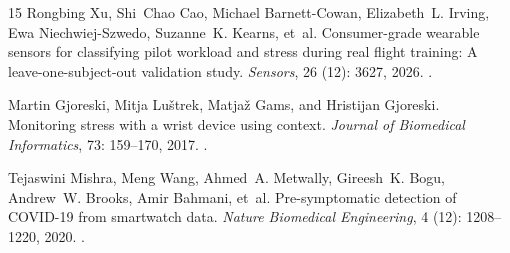 \documentclass{article}
\begin{document}
\begin{thebibliography}{15}
Rongbing Xu, Shi~Chao Cao, Michael Barnett-Cowan, Elizabeth~L. Irving, Ewa
  Niechwiej-Szwedo, Suzanne~K. Kearns, et~al.
\newblock Consumer-grade wearable sensors for classifying pilot workload and
  stress during real flight training: A leave-one-subject-out validation study.
\newblock \emph{Sensors}, 26 (12): 3627, 2026.
\newblock {}.

Martin Gjoreski, Mitja Lu{\v{s}}trek, Matja{\v{z}} Gams, and Hristijan
  Gjoreski.
\newblock Monitoring stress with a wrist device using context.
\newblock \emph{Journal of Biomedical Informatics}, 73: 159--170,
  2017.
\newblock {}.

Tejaswini Mishra, Meng Wang, Ahmed~A. Metwally, Gireesh~K. Bogu, Andrew~W.
  Brooks, Amir Bahmani, et~al.
\newblock Pre-symptomatic detection of {COVID-19} from smartwatch data.
\newblock \emph{Nature Biomedical Engineering}, 4 (12):
  1208--1220, 2020.
\newblock {}.

\end{thebibliography}
\end{document}
